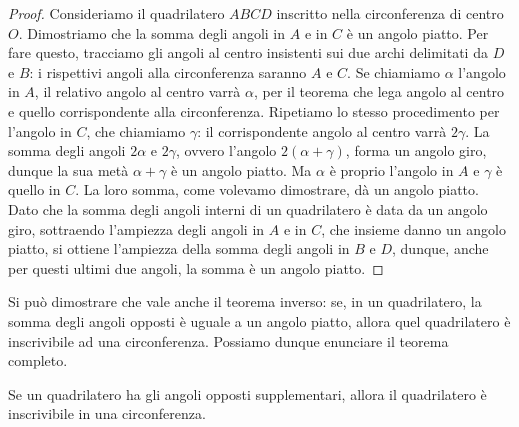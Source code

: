 \begin{proof}
Consideriamo il quadrilatero \(ABCD\) inscritto nella circonferenza di 
centro \(O\). Dimostriamo che la somma degli angoli in \(A\) e in \(C\) è 
un angolo piatto. Per fare questo, tracciamo gli angoli al centro 
insistenti sui due archi delimitati da \(D\) e \(B\): i rispettivi angoli 
alla circonferenza saranno \(A\) e \(C\). Se chiamiamo \(\alpha\) l'angolo 
in \(A\), il relativo angolo al centro varrà \(\alpha\), per il teorema 
che lega angolo al centro e quello corrispondente alla circonferenza. 
Ripetiamo lo stesso procedimento per l'angolo in \(C\), che chiamiamo 
\(\gamma\): il corrispondente angolo al centro varrà \(2\gamma\). La 
somma degli angoli \(2\alpha\) e \(2\gamma\), ovvero l'angolo 
\(2(\alpha+\gamma)\), forma un angolo giro, dunque la sua metà 
\(\alpha+\gamma\) è un angolo piatto. Ma \(\alpha\) è proprio l'angolo in 
\(A\) e \(\gamma\) è quello in \(C\). La loro somma, come volevamo 
dimostrare, dà un angolo piatto. Dato che la somma degli angoli 
interni di un quadrilatero è data da un angolo giro, sottraendo 
l'ampiezza degli angoli in \(A\) e in \(C\), che insieme danno un angolo 
piatto, si ottiene l'ampiezza della somma degli angoli in \(B\) e \(D\), 
dunque, anche per questi ultimi due angoli, la somma è un angolo 
piatto.
\end{proof}

Si può dimostrare che vale anche il teorema inverso: se, in un 
quadrilatero, la somma degli angoli opposti è uguale a un angolo 
piatto, allora quel quadrilatero è inscrivibile ad una circonferenza.
Possiamo dunque enunciare il teorema completo.

\begin{teorema}
Se un quadrilatero ha gli angoli opposti supplementari, allora il 
quadrilatero è inscrivibile in una circonferenza.
\end{teorema}


\begin{inaccessibleblock}
 \begin{figure}[htb]
	\centering
\end{figure}
\end{inaccessibleblock}

